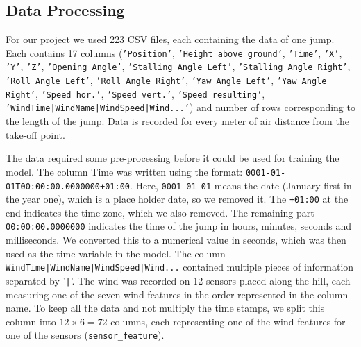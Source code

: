 \documentclass[sigconf,natbib=false, language=english]{acmart}
\begin{document}
\subsection{Data Processing}


For our project we used 223 CSV files, each containing the data of one jump. 
Each contains 17 columns (\texttt{'Position'}, \texttt{'Height above ground'}, \texttt{'Time'}, \texttt{'X'}, \texttt{'Y'}, \texttt{'Z'}, 
\texttt{'Opening Angle'}, \texttt{'Stalling Angle Left'}, \texttt{'Stalling Angle Right'}, 
\texttt{'Roll Angle Left'}, \texttt{'Roll Angle Right'}, \texttt{'Yaw Angle Left'}, \texttt{'Yaw Angle Right'}, 
\texttt{'Speed hor.'}, \texttt{'Speed vert.'}, \texttt{'Speed resulting'}, 
\texttt{'WindTime|WindName|WindSpeed|Wind...'})
and number of rows corresponding to the length of the jump. Data is recorded for every meter
of air distance from the take-off point.

The data required some pre-processing before it could be used for training the model.
The column Time was written using the format: \texttt{0001-01-01T00:00:00.0000000+01:00}. Here, 
\texttt{0001-01-01} means the date (January first in the year one), which is a place holder date, so we removed it.
The \texttt{+01:00} at the end indicates the time zone, which we also removed.
The remaining part \texttt{00:00:00.0000000} indicates the time of the jump in hours, minutes, seconds and milliseconds.
We converted this to a numerical value in seconds, which was then used as the time variable in the model.
The column \texttt{WindTime|WindName|WindSpeed|Wind...} contained multiple pieces of information separated by '\texttt{|}'.
The wind was recorded on 12 sensors placed along the hill, each measuring one of the seven wind features in the order 
represented in the column name. To keep all the data and not multiply the time stamps, we split this 
column into $12 \times 6 = 72$ columns, each representing one of the wind features for one of the sensors (\texttt{sensor\_feature}).
\end{document}
